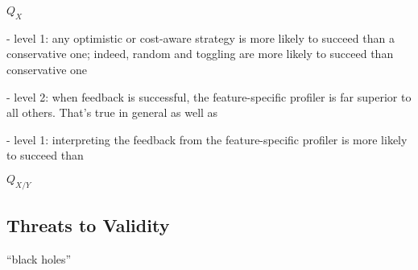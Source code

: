 	












$Q_X$

- level 1: any optimistic or cost-aware strategy is more likely to
  succeed than a conservative one; indeed, random and toggling are
  more likely to succeed than conservative one

- level 2: when feedback is successful, the feature-specific profiler
  is far superior to all others. That's true in general as well as 

- level 1: interpreting the feedback from the feature-specific
  profiler is more likely to succeed than 



$Q_{X/Y}$

\subsection{Threats to Validity}


``black holes''
